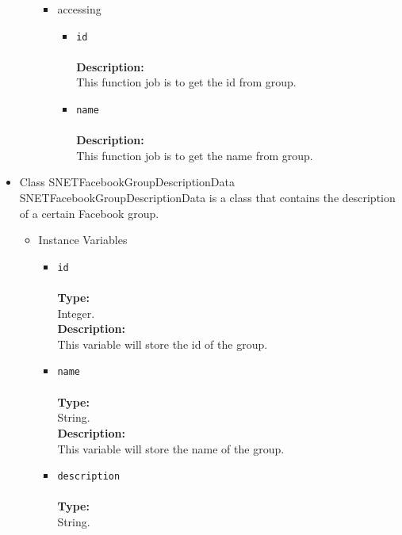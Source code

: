 \begin{itemize}
\begin{itemize}
\begin{itemize}
\item accessing
\label{sec-1-4-2-10-2-2}%
\begin{itemize}
\item \verb~id~\\\\
\textbf{Description:}\\
      This function job is to get the id from group.\\
\item \verb~name~\\\\
\textbf{Description:}\\
      This function job is to get the name from group.
\end{itemize}
\end{itemize} %
\end{itemize} %

\item Class SNETFacebookGroupDescriptionData\\
\label{sec-1-4-2-11}%
SNETFacebookGroupDescriptionData is a class that contains the description of a certain Facebook group.
   
\begin{itemize}

\item Instance Variables
\label{sec-1-4-2-11-1}%
\begin{itemize}
\item \verb~id~\\\\
\textbf{Type:}\\
     Integer.\\

     \textbf{Description:}\\
     This variable will store the id of the group.\\
\item \verb~name~\\\\
\textbf{Type:}\\
     String.\\

     \textbf{Description:}\\
     This variable will store the name of the group.
\item \verb~description~\\\\
\textbf{Type:}\\
     String.\\


\end{itemize}
\end{itemize}
\end{itemize}
